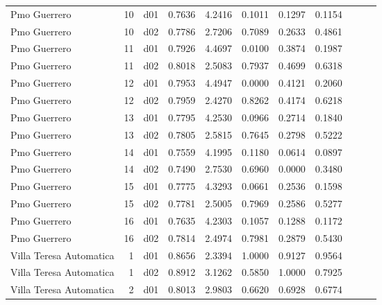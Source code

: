 \begin{landscape}
\begin{longtable}{p{2cm}rrrrrrrrrr}
            Pmo Guerrero  &         10 &     d01 &   0.7636 &  4.2416 &        0.1011 &           0.1297 &  0.1154 \\
            Pmo Guerrero  &         10 &     d02 &   0.7786 &  2.7206 &        0.7089 &           0.2633 &  0.4861 \\
            Pmo Guerrero  &         11 &     d01 &   0.7926 &  4.4697 &        0.0100 &           0.3874 &  0.1987 \\
            Pmo Guerrero  &         11 &     d02 &   0.8018 &  2.5083 &        0.7937 &           0.4699 &  0.6318 \\
            Pmo Guerrero  &         12 &     d01 &   0.7953 &  4.4947 &        0.0000 &           0.4121 &  0.2060 \\
            Pmo Guerrero  &         12 &     d02 &   0.7959 &  2.4270 &        0.8262 &           0.4174 &  0.6218 \\
            Pmo Guerrero  &         13 &     d01 &   0.7795 &  4.2530 &        0.0966 &           0.2714 &  0.1840 \\
            Pmo Guerrero  &         13 &     d02 &   0.7805 &  2.5815 &        0.7645 &           0.2798 &  0.5222 \\
            Pmo Guerrero  &         14 &     d01 &   0.7559 &  4.1995 &        0.1180 &           0.0614 &  0.0897 \\
            Pmo Guerrero  &         14 &     d02 &   0.7490 &  2.7530 &        0.6960 &           0.0000 &  0.3480 \\
            Pmo Guerrero  &         15 &     d01 &   0.7775 &  4.3293 &        0.0661 &           0.2536 &  0.1598 \\
            Pmo Guerrero  &         15 &     d02 &   0.7781 &  2.5005 &        0.7969 &           0.2586 &  0.5277 \\
            Pmo Guerrero  &         16 &     d01 &   0.7635 &  4.2303 &        0.1057 &           0.1288 &  0.1172 \\
            Pmo Guerrero  &         16 &     d02 &   0.7814 &  2.4974 &        0.7981 &           0.2879 &  0.5430 \\
 Villa Teresa Automatica  &          1 &     d01 &   0.8656 &  2.3394 &        1.0000 &           0.9127 &  0.9564 \\
 Villa Teresa Automatica  &          1 &     d02 &   0.8912 &  3.1262 &        0.5850 &           1.0000 &  0.7925 \\
 Villa Teresa Automatica  &          2 &     d01 &   0.8013 &  2.9803 &        0.6620 &           0.6928 &  0.6774 \\

\end{longtable}
\end{landscape}
